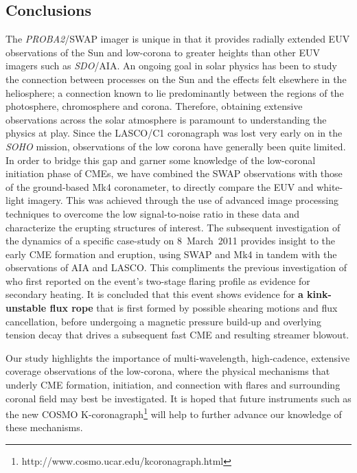 \documentclass[namedreferences]{solarphysics}
\begin{document}
\begin{article}
\section{Conclusions}
\label{sect:conclusions}

The \emph{PROBA2}/SWAP imager is unique in that it provides radially extended EUV observations of the Sun and low-corona to greater heights than other EUV imagers such as \emph{SDO}/AIA. An ongoing goal in solar physics has been to study the connection between processes on the Sun and the effects felt elsewhere in the heliosphere; a connection known to lie predominantly between the regions of the photosphere, chromosphere and corona. Therefore, obtaining extensive observations across the solar atmosphere is paramount to understanding the physics at play. Since the LASCO/C1 coronagraph was lost very early on in the \emph{SOHO} mission, observations of the low corona have generally been quite limited. In order to bridge this gap and garner some knowledge of the low-coronal initiation phase of CMEs, we have combined the SWAP observations with those of the ground-based Mk4 coronameter, to directly compare the EUV and white-light imagery. This was achieved through the use of advanced image processing techniques to overcome the low signal-to-noise ratio in these data and characterize the erupting structures of interest. The subsequent investigation of the dynamics of a specific case-study on 8~March~2011 provides insight to the early CME formation and eruption, using SWAP and Mk4 in tandem with the observations of AIA and LASCO. This compliments the previous investigation of  who first reported on the event's two-stage flaring profile as evidence for secondary heating. It is concluded that this event shows evidence for {\bf a kink-unstable flux rope} that is first formed by possible shearing motions and flux cancellation, before undergoing a magnetic pressure build-up and overlying tension decay that drives a subsequent fast CME and resulting streamer blowout. 

Our study highlights the importance of multi-wavelength, high-cadence, extensive coverage observations of the low-corona, where the physical mechanisms that underly CME formation, initiation, and connection with flares and surrounding coronal field may best be investigated. It is hoped that future instruments such as the new COSMO K-coronagraph\footnote{http://www.cosmo.ucar.edu/kcoronagraph.html} will help to further advance our knowledge of these mechanisms.



\end{article}
\end{document}
